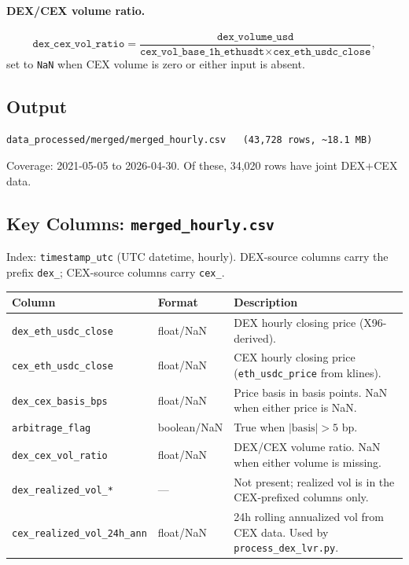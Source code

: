 \documentclass[11pt,a4paper]{article}
\begin{document}
\paragraph{DEX/CEX volume ratio.}
\[
  \texttt{dex\_cex\_vol\_ratio} = \frac{\texttt{dex\_volume\_usd}}
  {\texttt{cex\_vol\_base\_1h\_ethusdt} \times
  \texttt{cex\_eth\_usdc\_close}},
\]
set to \texttt{NaN} when CEX volume is zero or either input is absent.

\subsection{Output}

\begin{lstlisting}
data_processed/merged/merged_hourly.csv   (43,728 rows, ~18.1 MB)
\end{lstlisting}

Coverage: 2021-05-05 to 2026-04-30. Of these, 34,020 rows have
joint DEX+CEX data.

\subsection{Key Columns: \texttt{merged\_hourly.csv}}

Index: \texttt{timestamp\_utc} (UTC datetime, hourly).
DEX-source columns carry the prefix \texttt{dex\_}; CEX-source columns
carry \texttt{cex\_}.

\begin{xltabular}{\linewidth}{L{4.8cm}L{2.5cm}Y}
\toprule
\textbf{Column} & \textbf{Format} & \textbf{Description} \\
\midrule
\texttt{dex\_eth\_usdc\_close} & float/NaN & DEX hourly closing price
  (X96-derived). \\
\texttt{cex\_eth\_usdc\_close} & float/NaN & CEX hourly closing price
  (\texttt{eth\_usdc\_price} from klines). \\
\texttt{dex\_cex\_basis\_bps} & float/NaN & Price basis in basis points.
  NaN when either price is NaN. \\
\texttt{arbitrage\_flag} & boolean/NaN & True when $|\text{basis}| > 5$ bp. \\
\texttt{dex\_cex\_vol\_ratio} & float/NaN & DEX/CEX volume ratio. NaN
  when either volume is missing. \\
\texttt{dex\_realized\_vol\_*} & --- & Not present; realized vol is in
  the CEX-prefixed columns only. \\
\texttt{cex\_realized\_vol\_24h\_ann} & float/NaN & 24h rolling annualized
  vol from CEX data. Used by \texttt{process\_dex\_lvr.py}. \\
\bottomrule
\end{xltabular}
\end{document}
